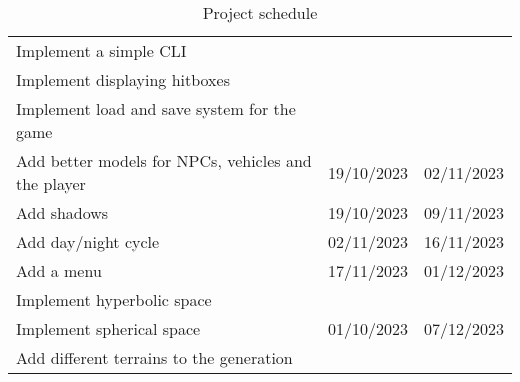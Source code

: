 \begin{table}[H]
\begin{tabular}{lll}
        Implement a simple CLI                              &                              &                              \\
        Implement displaying hitboxes                       &                              &                              \\
        Implement load and save system for the game         &                              &                              \\ \hline
        Add better models for NPCs, vehicles and the player & 19/10/2023                   & 02/11/2023                   \\ \hline
        Add shadows                                         & 19/10/2023                   & 09/11/2023                   \\ \hline
        Add day/night cycle                                 & 02/11/2023                   & 16/11/2023                   \\ \hline
        Add a menu                                          & 17/11/2023                   & 01/12/2023                   \\ \hline
        Implement hyperbolic space                          & \multirow{3}{*}{01/10/2023}  & \multirow{3}{*}{07/12/2023}  \\
        Implement spherical space                           &                              &                              \\
        Add different terrains to the generation            &                              &                              \\ \hline
    \end{tabular}
    \caption{Project schedule}
\end{table}